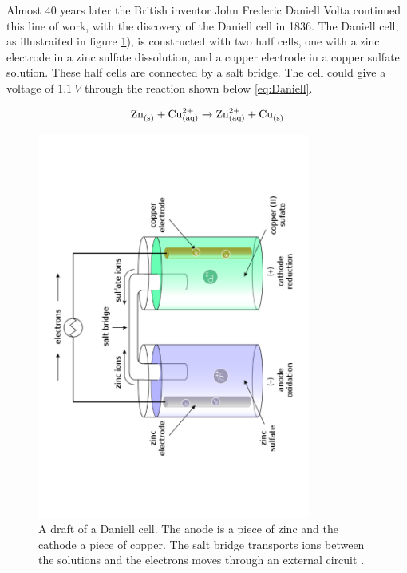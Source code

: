 Almost $40$ years later the British inventor John Frederic Daniell Volta continued this line of work, with the discovery of the Daniell cell \cite{daniell1836xi} in 1836. The Daniell cell, as illustraited in figure \ref{fig:DaniellCell}), is constructed with two half cells, one with a zinc electrode in a zinc sulfate dissolution, and a copper electrode in a copper sulfate solution. These half cells are connected by a salt bridge. The cell could give a voltage of $\SI{1.1}{V}$ through the reaction shown below \ref{eq:Daniell}.


\begin{align}\label{eq:Daniell}
\ce{Zn_{(s)}} + \ce{Cu^{2+}_{(aq)}} \rightarrow \ce{Zn^2+_{(aq)}} + \ce{Cu_{(s)}}
\end{align}

\begin{figure}[ht]
    \centering
    \includegraphics[angle=270,width=0.8\textwidth]{600px-Galvanic_cell_labeled.pdf}
    \caption[format=plain]{A draft of a Daniell cell. The anode is a piece of zinc and the cathode a piece of copper. The salt bridge transports ions between the solutions and the electrons moves through an external circuit \cite{wiki:Daniellcell}. }
    \label{fig:DaniellCell}
\end{figure}


